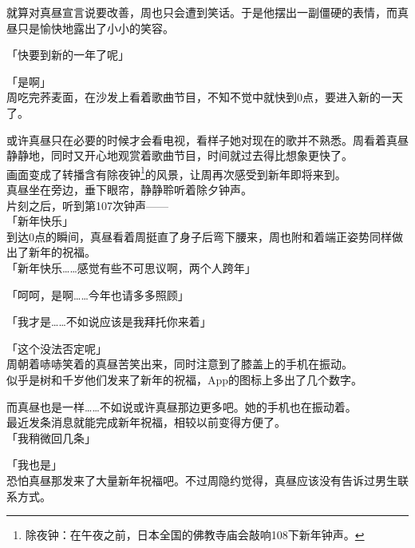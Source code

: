 就算对真昼宣言说要改善，周也只会遭到笑话。于是他摆出一副僵硬的表情，而真昼只是愉快地露出了小小的笑容。\\

\vspace{2\baselineskip}

「快要到新的一年了呢」

「是啊」\\

周吃完荞麦面，在沙发上看着歌曲节目，不知不觉中就快到0点，要进入新的一天了。

或许真昼只在必要的时候才会看电视，看样子她对现在的歌并不熟悉。周看着真昼静静地，同时又开心地观赏着歌曲节目，时间就过去得比想象更快了。\\

画面变成了转播含有除夜钟\footnote{除夜钟：在午夜之前，日本全国的佛教寺庙会敲响108下新年钟声。}的风景，让周再次感受到新年即将来到。\\

真昼坐在旁边，垂下眼帘，静静聆听着除夕钟声。\\

片刻之后，听到第107次钟声——\\

「新年快乐」\\

到达0点的瞬间，真昼看着周挺直了身子后弯下腰来，周也附和着端正姿势同样做出了新年的祝福。\\

「新年快乐……感觉有些不可思议啊，两个人跨年」

「呵呵，是啊……今年也请多多照顾」

「我才是……不如说应该是我拜托你来着」

「这个没法否定呢」\\

周朝着哧哧笑着的真昼苦笑出来，同时注意到了膝盖上的手机在振动。\\

似乎是树和千岁他们发来了新年的祝福，App的图标上多出了几个数字。

而真昼也是一样……不如说或许真昼那边更多吧。她的手机也在振动着。\\

最近发条消息就能完成新年祝福，相较以前变得方便了。\\

「我稍微回几条」

「我也是」\\

恐怕真昼那发来了大量新年祝福吧。不过周隐约觉得，真昼应该没有告诉过男生联系方式。\\


